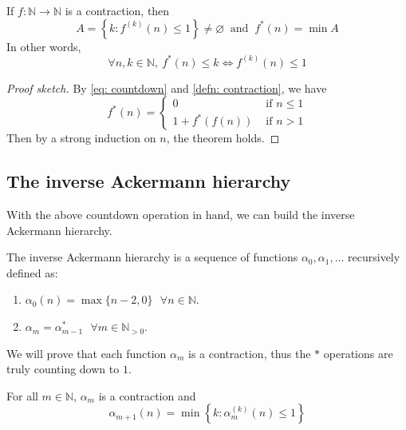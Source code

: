 \begin{thm} \label{thm: countdown contraction}
If $f: \mathbb{N} \to \mathbb{N}$ is a contraction, then
\begin{equation*}
A = \left\{k: f^{(k)}(n) \le 1\right\} \neq \varnothing \ \text{ and } \ f^*(n) = \min A
\end{equation*}
In other words,
\begin{equation*}
\forall n, k\in \mathbb{N}, \ f^*(n) \le k \iff f^{(k)}(n) \le 1
\end{equation*}
\end{thm}

\begin{proof}[Proof sketch]
By \eqref{eq: countdown} and \cref{defn: contraction}, we have
\begin{equation*}
f^*(n) = \begin{cases}
0 & \text{ if } n \le 1 \\ 1 + f^*(f(n)) & \text{ if } n > 1
\end{cases}
\end{equation*}
Then by a strong induction on $n$, the theorem holds.
\end{proof}
\fi

\iffalse 
\subsection{The inverse Ackermann hierarchy}

With the above countdown operation in hand, we can 
build the inverse Ackermann hierarchy.

\begin{defn} \label{defn: inv_ack_hier}
The inverse Ackermann hierarchy is a sequence of 
functions $\alpha_0, \alpha_1, \ldots $ recursively defined as:
\begin{enumerate}
	\item $\alpha_0(n) = \max\{n-2, 0\} \ \ \ \forall n \in \mathbb{N}$.
	\item $\alpha_m = \alpha_{m-1}^*  \ \ \ \forall m\in \mathbb{N}_{>0}$.
\end{enumerate}
\end{defn}

We will prove that each function $\alpha_m$ is a contraction, 
thus the $*$ operations are truly counting down to $1$.

\begin{thm} \label{thm: inv_ack_countdown}
For all $m\in\mathbb{N}$, $\alpha_m$ is a contraction and
\begin{equation}
\alpha_{m+1}(n) = \min\left\{ k : \alpha_m^{(k)}(n) \le 1 \right\}
\end{equation}
\end{thm}

